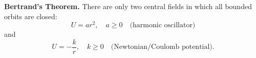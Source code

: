 \textbf{Bertrand's Theorem.} There are only two central fields in which all bounded orbits are closed:
$$U = ar^2, \quad a \geq 0 \quad \text{(harmonic oscillator)}$$
and
$$U = -\frac{k}{r}, \quad k \geq 0 \quad \text{(Newtonian/Coulomb potential)}.$$
